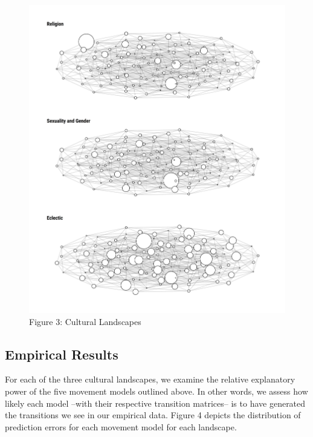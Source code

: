 \documentclass[
  11pt,
]{article}
\begin{document}
\begin{figure}[htp]
\begin{center}
\caption*{Figure 3: Cultural Landscapes}

\begin{center}\includegraphics[width=1\linewidth]{../figures/figure_3} \end{center}

\end{center}
\end{figure}

\hypertarget{empirical-results}{%
\subsection{Empirical Results}\label{empirical-results}}

For each of the three cultural landscapes, we examine the relative
explanatory power of the five movement models outlined above. In other
words, we assess how likely each model --with their respective
transition matrices-- is to have generated the transitions we see in our
empirical data. Figure 4 depicts the distribution of prediction errors
for each movement model for each landscape.
\end{document}
